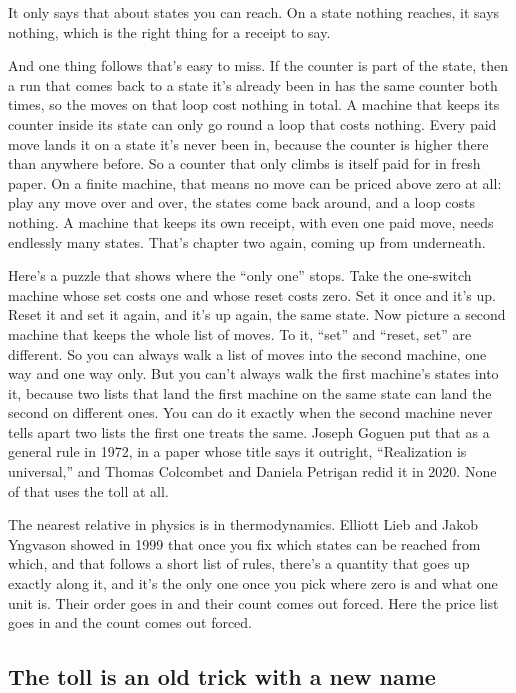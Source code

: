 \documentclass[11pt,twoside]{article}
\theoremstyle{thielethm}
\theoremstyle{thieledef}
\theoremstyle{thieledef}
\theoremstyle{thieledef}
\theoremstyle{thielethm}
\theoremstyle{thieleobs}
\theoremstyle{thielethm}
\begin{document}
It only says that about states you can reach. On a state nothing reaches, it says nothing, which is the right thing for a receipt to say.

And one thing follows that's easy to miss. If the counter is part of the state, then a run that comes back to a state it's already been in has the same counter both times, so the moves on that loop cost nothing in total. A machine that keeps its counter inside its state can only go round a loop that costs nothing. Every paid move lands it on a state it's never been in, because the counter is higher there than anywhere before. So a counter that only climbs is itself paid for in fresh paper. On a finite machine, that means no move can be priced above zero at all: play any move over and over, the states come back around, and a loop costs nothing. A machine that keeps its own receipt, with even one paid move, needs endlessly many states. That's chapter two again, coming up from underneath.

Here's a puzzle that shows where the ``only one'' stops. Take the one-switch machine whose set costs one and whose reset costs zero. Set it once and it's up. Reset it and set it again, and it's up again, the same state. Now picture a second machine that keeps the whole list of moves. To it, ``set'' and ``reset, set'' are different. So you can always walk a list of moves into the second machine, one way and one way only. But you can't always walk the first machine's states into it, because two lists that land the first machine on the same state can land the second on different ones. You can do it exactly when the second machine never tells apart two lists the first one treats the same. Joseph Goguen put that as a general rule in 1972, in a paper whose title says it outright, ``Realization is universal,'' and Thomas Colcombet and Daniela Petrişan redid it in 2020. None of that uses the toll at all.

The nearest relative in physics is in thermodynamics. Elliott Lieb and Jakob Yngvason showed in 1999 that once you fix which states can be reached from which, and that follows a short list of rules, there's a quantity that goes up exactly along it, and it's the only one once you pick where zero is and what one unit is. Their order goes in and their count comes out forced. Here the price list goes in and the count comes out forced.

\subsection{The toll is an old trick with a new name}
\end{document}

